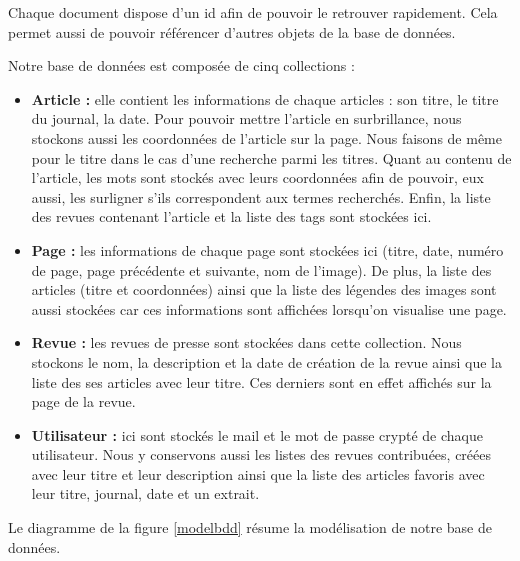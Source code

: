 Chaque document dispose d’un id afin de pouvoir le retrouver rapidement. Cela permet aussi de pouvoir référencer d’autres objets de la base de données. 

Notre base de données est composée de cinq collections :
\begin{itemize}
	\item \textbf{Article :} elle contient les informations de chaque articles : son titre, le titre du journal, la date. Pour pouvoir mettre l'article en surbrillance, nous stockons aussi les coordonnées de l'article sur la page. Nous faisons de même pour le titre dans le cas d'une recherche parmi les  titres. Quant au contenu de l'article, les mots sont stockés avec leurs coordonnées afin de pouvoir, eux aussi, les surligner s'ils correspondent aux termes recherchés. Enfin, la liste des revues contenant l'article et la liste des tags sont stockées ici.
	\item \textbf{Page :} les informations de chaque page sont stockées ici (titre, date, numéro de page, page précédente et suivante, nom de l'image). De plus, la liste des articles (titre et coordonnées) ainsi que la liste des légendes des images sont aussi stockées car ces informations sont affichées lorsqu'on visualise une page.
	\item \textbf{Revue :} les revues de presse sont stockées dans cette collection. Nous stockons le nom, la description et la date de création de la revue ainsi que la liste des ses articles avec leur titre. Ces derniers sont en effet affichés sur la page de la revue.
	\item \textbf{Utilisateur :} ici sont stockés le mail et le mot de passe crypté de chaque utilisateur. Nous y conservons aussi les listes des revues contribuées, créées avec leur titre et leur description ainsi que la liste des articles favoris avec leur titre, journal, date et un extrait.
	\end{itemize}

Le diagramme de la figure \ref{modelbdd} résume la modélisation de notre base de données.


